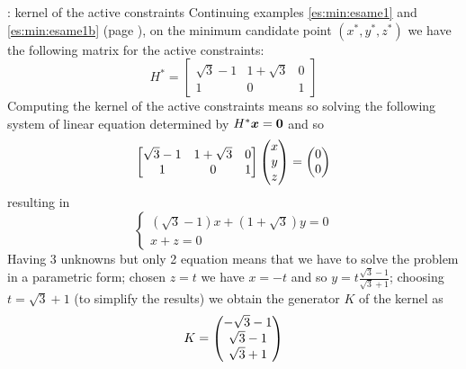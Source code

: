 	\begin{example}{: kernel of the active constraints} \label{es:min:esame1c}
		Continuing examples \ref{es:min:esame1} and \ref{es:min:esame1b} (page \pageref{es:min:esame1b}), on the minimum candidate point $(x^*,y^*,z^*)$ we have the following matrix for the active constraints:
		\[ H^*= \begin{bmatrix}
			\sqrt 3 - 1 & 1 + \sqrt 3 & 0 \\ 1 & 0 & 1
		\end{bmatrix} \]
		Computing the kernel of the active constraints means so solving the following system of linear equation determined by $H^* \boldsymbol{x} = \boldsymbol{0}$ and so
		\[\begin{bmatrix}
			\sqrt 3 - 1 & 1 + \sqrt 3 & 0 \\ 1 & 0 & 1
		\end{bmatrix} \begin{pmatrix}
			x \\ y \\ z
		\end{pmatrix} = \begin{pmatrix} 0 \\ 0 \end{pmatrix}\]
		resulting in
		\[ \begin{cases}
			(\sqrt 3 - 1) x + (1 + \sqrt 3) y = 0 \\ x + z = 0
		\end{cases} \]
		Having 3 unknowns but only 2 equation means that we have to solve the problem in a parametric form; chosen $z = t$ we have $x = -t$ and so $y = t \frac{\sqrt 3 - 1}{\sqrt 3 + 1}$; choosing $t = \sqrt 3 + 1$ (to simplify the results) we obtain the generator $K$ of the kernel as
		\[ K = \begin{pmatrix}  -\sqrt 3 - 1 \\ \sqrt 3 - 1 \\ \sqrt 3 +1  \end{pmatrix} \] 
	\end{example}
	
